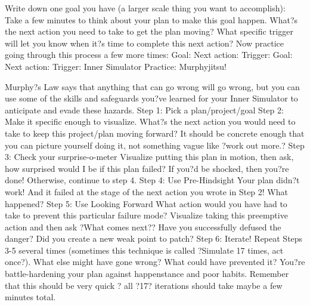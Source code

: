Write down one goal you have (a larger scale thing you want to accomplish):
Take a few minutes to think about your plan to make this goal happen.  What?s the next action you need to take to get the plan moving?
What specific trigger will let you know when it?s time to complete this next action?
Now practice going through this process a few more times: 
Goal:
Next action: 
Trigger: 
Goal: 
Next action: 
Trigger:
Inner Simulator Practice: Murphyjitsu!

Murphy?s Law says that anything that can go wrong will go wrong, but you can use some of the skills and safeguards you?ve learned for your Inner Simulator to anticipate and evade these hazards.
Step 1: Pick a plan/project/goal
Step 2: Make it specific enough to visualize. 
What?s the next action you would need to take to keep this project/plan moving forward?  It should be concrete enough that you can picture yourself doing it, not something vague like ?work out more.?
Step 3: Check your surprise-o-meter
Visualize putting this plan in motion, then ask, how surprised would I be if this plan failed?  If you?d be shocked, then you?re done!  Otherwise, continue to step 4.
Step 4: Use Pre-Hindsight
Your plan didn?t work!  And it failed at the stage of the next action you wrote in Step 2!  What happened?
Step 5: Use Looking Forward
What action would you have had to take to prevent this particular failure mode?  Visualize taking this preemptive action and then ask ?What comes next??  Have you successfully defused the danger?  Did you create a new weak point to patch?
Step 6: Iterate!
Repeat Steps 3-5 several times (sometimes this technique is called ?Simulate 17 times, act once?).  What else might have gone wrong?  What could have prevented it?  You?re battle-hardening your plan against happenstance and poor habits.  Remember that this should be very quick ? all ?17? iterations should take maybe a few minutes total.
